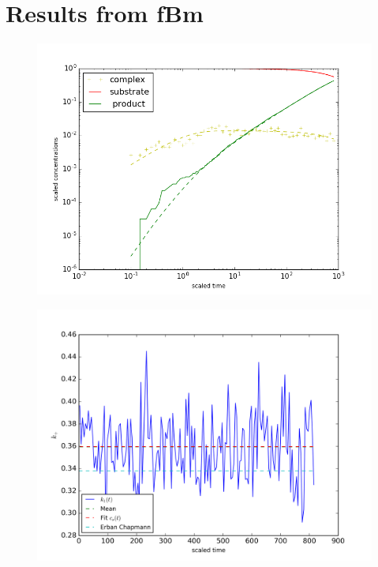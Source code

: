 \documentclass[
  a4paper,BCOR10mm,oneside,
  bibtotoc,idxtotoc,
  headsepline,footsepline,%
  fleqn,openbib
]{scrbook}
\begin{document}
\section{Results from fBm}
\begin{figure}[h!]
  \centering
  \includegraphics[width=\textwidth]{./data/erban-chapman-limit-concentrations1.png}
  \captionsetup{width=\linewidth}
  \label{fig:diffusion_limit-Erban-Chapmann}
\end{figure}
\begin{figure}[h!]
  \centering
  \includegraphics[width=\textwidth]{./data/chapman-limit-concentrations1_k1.png}
  \captionsetup{width=\linewidth}
  \label{fig:diffusion_limit-Erban-Chapmann_k1}
\end{figure}
\end{document}
